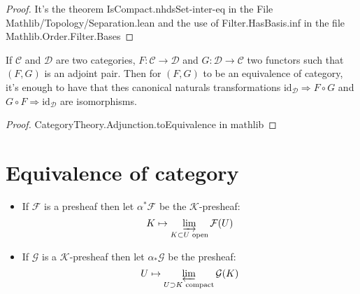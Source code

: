 \begin{proof}
    It's the theorem IsCompact.nhdsSet-inter-eq  in the File Mathlib/Topology/Separation.lean and the use of Filter.HasBasis.inf in the file  Mathlib.Order.Filter.Bases



\end{proof}

\begin{lemma}\label{lem:equiv_of_adj}
    If $\mathcal{C}$ and $\mathcal{D}$ are two categories, $F:\mathcal{C}\to \mathcal{D}$ and $G:\mathcal{D}\to \mathcal{C}$ two functors such that $(F,G)$ is an adjoint pair. Then for $(F,G)$ to be an equivalence of category, it's enough to have that thes canonical naturals transformations $\text{id}_{\mathcal{D}}\Rightarrow F\circ G$ and $G\circ F\Rightarrow \text{id}_{\mathcal{D}}$ are isomorphisms.
\end{lemma}

\begin{proof}
    CategoryTheory.Adjunction.toEquivalence in mathlib
\end{proof}


\section{Equivalence of category}

\begin{definition}\label{def:adj_kprshv_and_prshv}
    \begin{itemize}
        \item If $\mathcal{F}$ is a presheaf then let $\alpha^*\mathcal{F}$ be the $\mathcal{K}$-presheaf:\[K\mapsto \varinjlim\limits_{K\subset U \text{ open}}\mathcal{F}(U)\]
        \item If $\mathcal{G}$ is a $\mathcal{K}$-presheaf then let $\alpha_*\mathcal{G}$ be the presheaf:\[ U\mapsto \varprojlim\limits_{U\supset K \text{ compact}}\mathcal{G}(K)\]
    \end{itemize}
\end{definition}

